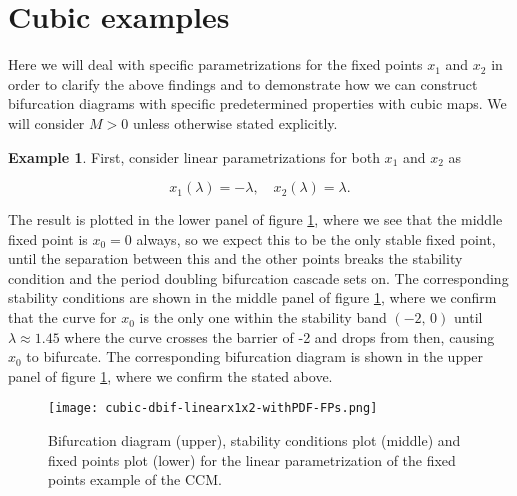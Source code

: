 \documentclass[10pt,twoside,titlepage]{book}
\numberwithin{equation}{chapter}
\numberwithin{figure}{chapter}
\numberwithin{table}{chapter}
\theoremstyle{plain}%
\theoremstyle{definition}
\newtheorem{example}{Example}[chapter]
\theoremstyle{remark}
\begin{document}
\section{Cubic examples}
\label{sec:CCM-examples}

Here we will deal with specific parametrizations for the fixed points $x_1$ and $x_2$ in order to clarify the above findings and to demonstrate how we can construct bifurcation diagrams with specific predetermined properties with cubic maps. We will consider $M>0$ unless otherwise stated explicitly.

\begin{example}
	\label{ex:CCM-linx1linx2}
	First, consider linear parametrizations for both $x_1$ and $x_2$ as
	
	\begin{equation}
		x_1(\lambda)=-\lambda,\quad x_2(\lambda)=\lambda.
		\label{eq:linx1linx2}
	\end{equation}
	
	The result is plotted in the lower panel of figure \ref{fig:CCM-linx1linx2}, where we see that the middle fixed point is $x_0=0$ always, so we expect this to be the only stable fixed point, until the separation between this and the other points breaks the stability condition and the period doubling bifurcation cascade sets on. The corresponding stability conditions are shown in the middle panel of figure \ref{fig:CCM-linx1linx2}, where we confirm that the curve for $x_0$ is the only one within the stability band $(-2,\,0)$ until $\lambda\approx1.45$ where the curve crosses the barrier of -2 and drops from then, causing $x_0$ to bifurcate. The corresponding bifurcation diagram is shown in the upper panel of figure \ref{fig:CCM-linx1linx2}, where we confirm the stated above.
	\begin{figure}
		\centering
		\texttt{[image: cubic-dbif-linearx1x2-withPDF-FPs.png]}
		\caption{Bifurcation diagram (upper), stability conditions plot (middle) and fixed points plot (lower) for the linear parametrization of the fixed points example of the CCM.}
		\label{fig:CCM-linx1linx2}
	\end{figure}
\end{example}

\FloatBarrier
\end{document}
